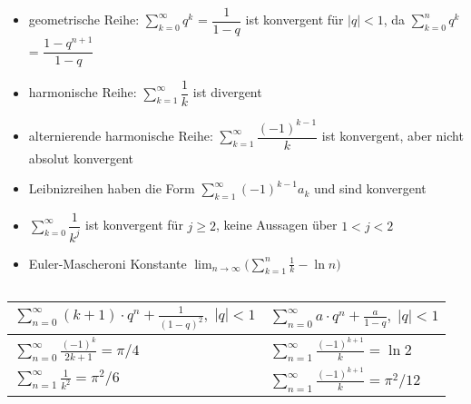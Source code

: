   \begin{example} $ $\\
    \begin{itemize}
      \item geometrische Reihe: $\sum_{k=0}^{\infty} q^k$ = $\dfrac{1}{1-q}$ ist konvergent für $|q| < 1$, da $\sum_{k=0}^{n} q^k$ = $\dfrac{1-q^{n+1}}{1-q}$
      \item harmonische Reihe: $\sum_{k=1}^{\infty} \dfrac{1}{k}$ ist divergent
      \item alternierende harmonische Reihe: $\sum_{k=1}^{\infty} \dfrac{(-1)^{k-1}}{k}$ ist konvergent, aber nicht absolut konvergent
      \item Leibnizreihen haben die Form $\sum_{k=1}^{\infty} (-1)^{k-1}a_k$ und sind konvergent
      \item $\sum_{k=0}^{\infty} \dfrac{1}{k^j}$ ist konvergent für $j \geq 2$, keine Aussagen über $1<j<2$
      \item Euler-Mascheroni Konstante $\lim_{n \to \infty} \big(\sum_{k=1}^n \frac{1}{k} - \ln n \big)$
    \end{itemize}
  \end{example}
  
  \begin{example}
  $ $\\
  	\renewcommand{\arraystretch}{1.5}
  	\begin{tabular}{| l | l |}
  			\hline
    	$\sum_{n=0}^\infty (k+1) \cdot q^n + \frac{1}{(1-q)^2}, \; |q| < 1$ & $\sum_{n=0}^\infty a \cdot q^n + \frac{a}{1-q}, \; |q| < 1$ \\
        	\hline
        $\sum_{n=0}^\infty \frac{(-1)^k}{2k+1} = \pi /4$ & $\sum_{n=1}^\infty \frac{(-1)^{k+1}}{k} = \ln 2$ \\
        	\hline
        $\sum_{n=1}^\infty \frac{1}{k^2} = \pi^2 / 6$ & $\sum_{n=1}^\infty \frac{(-1)^{k+1}}{k} = \pi^2 / 12$ \\
        	\hline
  	\end{tabular}
  \end{example}
  
